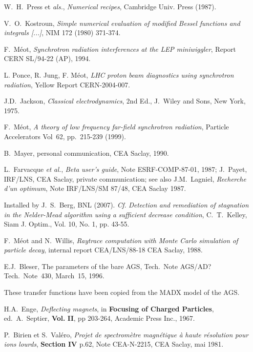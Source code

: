 \begin{thebibliography}{99}
 W.~H.~Press et {\it als.}, \textsl{Numerical recipes}, Cambridge Univ. Press (1987).  

 V.~O.~Kostroun, 
\textsl{Simple numerical evaluation of modified Bessel functions and integrals [...]}, 
NIM 172 (1980) 371-374. 

 F.~M\'eot, \textsl{Synchrotron radiation interferences at the LEP miniwiggler}, 
Report CERN SL/94-22 (AP), 1994. 

 L. Ponce,  R. Jung, F. M\'eot, 
\textsl{LHC proton beam diagnostics using synchrotron radiation},  
Yellow Report CERN-2004-007. 

 J.D.~Jackson, \textsl{Classical electrodynamics}, 2nd 
Ed., J.~Wiley and Sons, New York, 1975.

 F.~M\'eot, 
\textsl{A theory of low frequency far-field synchrotron radiation}, 
 Particle Accelerators Vol~62, pp.~215-239  (1999). 

 B.~Mayer, personal communication,
CEA Saclay, 1990. 

 L.~Farvacque \textsl{et al.}, \textsl{Beta user's guide}, Note 
ESRF-COMP-87-01, 1987; 
J.~Payet, IRF/LNS, CEA Saclay, private communication; see also J.M.~Lagniel, 
\textsl{Recherche d'un optimum}, Note IRF/LNS/SM 87/48, CEA Saclay 1987.

 Installed by J.~S.~Berg, BNL (2007). \emph{Cf.} \textsl{Detection and remediation of stagnation in the 
Nelder-Mead algorithm using a sufficient decrease condition}, 
  C.~T.~Kelley, Siam J. Optim., Vol. 10, No. 1, pp. 43-55. 

 F.~M\'eot and N.~Willis, \textsl{Raytrace computation with 
Monte Carlo simulation of particle decay}, internal report CEA/LNS/88-18 
CEA Saclay, 1988. 

 E.J.~Bleser, The parameters of the bare AGS, Tech.~Note AGS/AD?Tech.~Note~430, March~15, 1996.

 These transfer functions have been copied from the MADX model of the AGS.

 H.A.~Enge, \textsl{Deflecting magnets}, in \textbf{Focusing of 
Charged Particles}, ed.~A.~Septier, \textbf{Vol.}  \textbf{II}, pp 203-264, Academic
Press Inc., 1967.

 P.~Birien et S.~Val\'ero, \textsl{Projet de spectrom\`etre 
magn\'etique \`a haute r\'esolution pour ions lourds}, \textbf{Section IV} 
p.62, Note CEA-N-2215, CEA Saclay, mai 1981.


\end{thebibliography}
